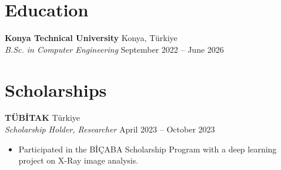 \documentclass[10pt,a4paper]{extarticle}
\begin{document}
\section{Education}
\textbf{Konya Technical University} \hfill Konya, Türkiye\\
\textit{B.Sc. in Computer Engineering} \hfill September 2022 -- June 2026
\section{Scholarships}
\textbf{TÜBİTAK} \hfill Türkiye\\
\textit{Scholarship Holder, Researcher} \hfill April 2023 -- October 2023
\begin{itemize}[leftmargin=*,noitemsep,topsep=0pt]
    \item Participated in the BİÇABA Scholarship Program with a deep learning project on X-Ray image analysis.
\end{itemize}
\end{document}

